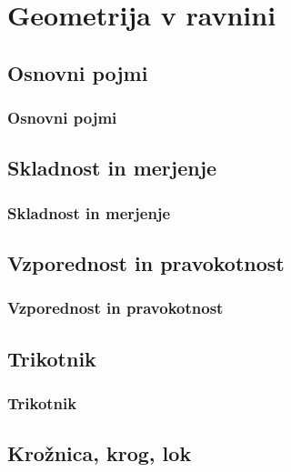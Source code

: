 \section{Geometrija v ravnini}

\begin{frame}
    \sectionpage
\end{frame}

\begin{frame}
\end{frame}

    \subsection{Osnovni pojmi}

        \begin{frame}
            \frametitle{Osnovni pojmi}
        \end{frame}

    \subsection{Skladnost in merjenje}

        \begin{frame}
            \frametitle{Skladnost in merjenje}
        \end{frame}

    \subsection{Vzporednost in pravokotnost}

        \begin{frame}
            \frametitle{Vzporednost in pravokotnost}
        \end{frame}

    \subsection{Trikotnik}

        \begin{frame}
            \frametitle{Trikotnik}
        \end{frame}

    \subsection{Krožnica, krog, lok}


